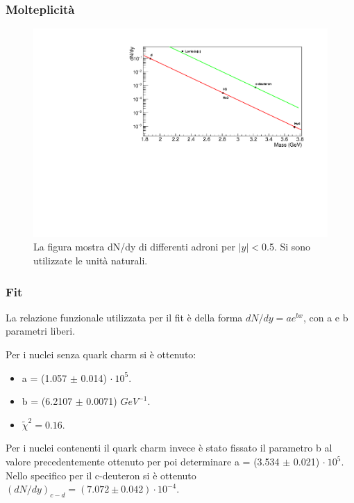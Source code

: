 \documentclass[11pt]{beamer}
\begin{document}
	
	\begin{frame}
		\frametitle{Molteplicità}
		\begin{figure}
			\includegraphics[width=0.9\linewidth]{pictures/first_graph.pdf}
			\caption{La figura mostra dN/dy di differenti adroni per $|y|<$0.5. Si sono utilizzate le unità naturali.}
		\end{figure}
		
	\end{frame}
	
	\begin{frame}
		\frametitle{Fit}
		La relazione funzionale utilizzata per il fit è della forma $dN/dy= a e^{bx}$, con a e b parametri liberi. 
		
		Per i nuclei senza quark charm si è ottenuto:
		\begin{itemize}
			\item a = (1.057 $\pm$ 0.014) $\cdot \ 10^5$.
			\item b = (6.2107 $\pm$ 0.0071) $GeV^{-1}$. 
			\item $\tilde{\chi}^2 = 0.16$. 
		\end{itemize}
		Per i nuclei contenenti il quark charm invece è stato fissato il parametro b al valore precedentemente ottenuto per poi determinare a = (3.534 $\pm$ 0.021) $\cdot \ 10^5$.
		Nello specifico per il c-deuteron si è ottenuto $(dN/dy)_{c-d}= (7.072 \pm 0.042) \cdot 10^{-4}$.
	\end{frame}
	
\end{document}
